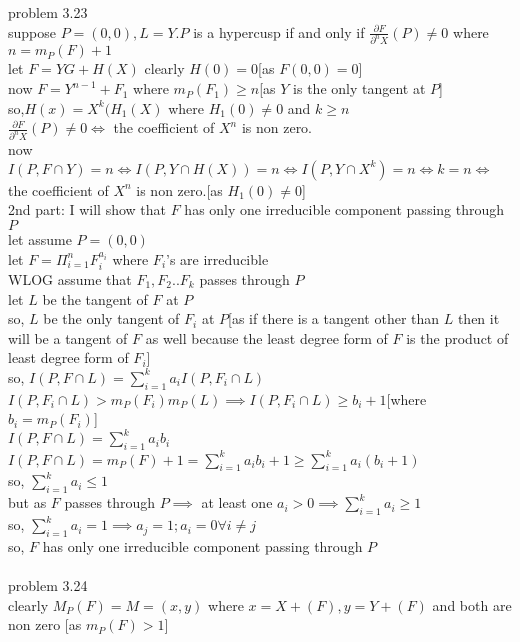 \documentclass[11pt]{amsart}
\theoremstyle{definition}
\begin{document}
problem 3.23\\
suppose $P=(0,0),L=Y$.$P$ is a hypercusp if and only if $\frac{\partial F}{{\partial^n X}}(P) \neq 0$ where $n=m_P(F)+1$\\
let $F=YG+H(X)$ clearly $H(0)=0$[as $F(0,0)=0$]\\
now $F=Y^{n-1}+F_1$ where $m_P(F_1)\geq n$[as $Y$ is the only tangent at $P$]\\
so,$H(x)=X^k(H_1(X)$ where $H_1(0)\neq 0$ and $k\geq n$\\
$\frac{\partial F}{{\partial^n X}}(P) \neq 0\iff$ the coefficient of $X^n$ is non zero.\\
now $I(P,F\cap Y)=n\iff I(P,Y\cap H(X))=n\iff I(P,Y\cap X^k)=n\iff k=n\iff$the coefficient of $X^n$ is non zero.[as $H_1(0)\neq 0$]\\
2nd part:
I will show that $F$ has only one irreducible component passing through $P$\\
let assume $P=(0,0)$\\
let $F=\Pi_{i=1}^n F_i^{a_i}$ where $F_i$'s are irreducible \\
WLOG assume that  $F_1,F_2..F_k$ passes through $P$\\
let $L$ be the tangent of $F$ at $P$\\
so, $L$ be the only tangent of $F_i$ at $P$[as if there is a tangent other than $L$ then it will be a tangent of $F$ as well because the least degree form of $F$ is the product of least degree form of $F_i$]\\
so, $I(P,F\cap L)=\sum_{i=1}^k a_i I(P,F_i\cap L)$\\
$ I(P,F_i\cap L)>m_P(F_i)m_P(L)\implies  I(P,F_i\cap L)\geq b_i+1$[where $b_i=m_P(F_i)$]\\
$ I(P,F\cap L)=\sum_{i=1}^k a_i b_i$\\
$ I(P,F\cap L)=m_P(F)+1=\sum_{i=1}^k a_i b_i+1\geq\sum_{i=1}^k a_i(b_i+1)$\\
so, $\sum_{i=1}^k a_i \leq 1$\\
but as $F$ passes through $P\implies$ at least one $a_i>0\implies \sum_{i=1}^k a_i\geq 1$\\
so, $\sum_{i=1}^k a_i=1\implies a_j=1;a_i=0\forall i\neq j$\\
so, $F$ has only one irreducible component passing through $P$\\\\
problem 3.24\\
clearly $M_P(F)=M=(x,y)$ where $x=X+(F),y=Y+(F)$ and both are non zero [as $m_P(F)>1]$\\
\end{document}
